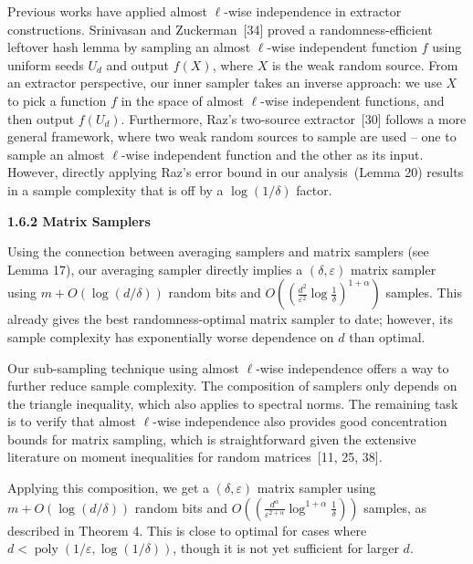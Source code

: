 Previous works have applied almost $\ell$-wise independence in extractor constructions. Srinivasan and Zuckerman [34] proved a randomness-efficient leftover hash lemma by sampling an almost $\ell$-wise independent function $f$ using uniform seeds $U_{d}$ and output $f(X)$, where $X$ is the weak random source. From an extractor perspective, our inner sampler takes an inverse approach: we use $X$ to pick a function $f$ in the space of almost $\ell$-wise independent functions, and then output $f(U_{d})$. Furthermore, Raz’s two-source extractor [30] follows a more general framework, where two weak random sources to sample are used – one to sample an almost $\ell$-wise independent function and the other as its input. However, directly applying Raz’s error bound in our analysis (Lemma 20) results in a sample complexity that is off by a $\log(1/\delta)$ factor.\par





\par\medskip\noindent\textbf{
1.6.2 Matrix Samplers}\par




Using the connection between averaging samplers and matrix samplers (see Lemma 17), our averaging sampler directly implies a $(\delta,\varepsilon)$ matrix sampler using $m+O(\log(d/\delta))$ random bits and $O((\frac{d^{2}}{\varepsilon^{2}}\log\frac{1}{\delta})^{1+\alpha})$ samples. This already gives the best randomness-optimal matrix sampler to date; however, its sample complexity has exponentially worse dependence on $d$ than optimal.\par




Our sub-sampling technique using almost $\ell$-wise independence offers a way to further reduce sample complexity.
The composition of samplers only depends on the triangle inequality, which also applies to spectral norms.
The remaining task is to verify that almost $\ell$-wise independence also provides good concentration bounds for matrix sampling, which is straightforward given the extensive literature on moment inequalities for random matrices [11, 25, 38].\par




Applying this composition, we get a $(\delta,\varepsilon)$ matrix sampler using $m+O(\log(d/\delta))$ random bits and $O((\frac{d^{\alpha}}{\varepsilon^{2+\alpha}}\log^{1+\alpha}\frac{1}{\delta}))$ samples, as described in Theorem 4. This is close to optimal for cases where $d<\operatorname*{poly}(1/\varepsilon,\log(1/\delta))$, though it is not yet sufficient for
larger $d$.\par




